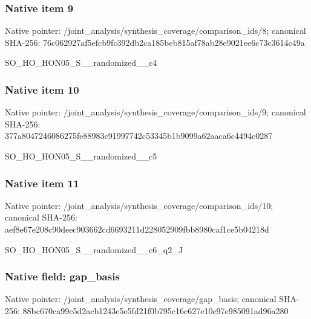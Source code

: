 \documentclass[10pt,a4paper]{article}
\begin{document}
\subsubsection{Native item 9}
Native pointer: /joint\_\allowbreak{}analysis/synthesis\_\allowbreak{}coverage/comparison\_\allowbreak{}ids/8; canonical SHA-256: 76c062927af5efcb9fc392db2ca185beb815af78ab28e9021ee6c73c3614c49a

\begingroup\raggedright\sloppy SO\_\allowbreak{}HO\_\allowbreak{}HON05\_\allowbreak{}S\_\allowbreak{}\_\allowbreak{}randomized\_\allowbreak{}\_\allowbreak{}c4\par\endgroup

\subsubsection{Native item 10}
Native pointer: /joint\_\allowbreak{}analysis/synthesis\_\allowbreak{}coverage/comparison\_\allowbreak{}ids/9; canonical SHA-256: 377a8047246086275fe88983c91997742c53345b1b9099a62aaca6c4494c0287

\begingroup\raggedright\sloppy SO\_\allowbreak{}HO\_\allowbreak{}HON05\_\allowbreak{}S\_\allowbreak{}\_\allowbreak{}randomized\_\allowbreak{}\_\allowbreak{}c5\par\endgroup

\subsubsection{Native item 11}
Native pointer: /joint\_\allowbreak{}analysis/synthesis\_\allowbreak{}coverage/comparison\_\allowbreak{}ids/10; canonical SHA-256: aef8e67e208c90deec903662cd6693211d228052909fbb8980caf1ce5b04218d

\begingroup\raggedright\sloppy SO\_\allowbreak{}HO\_\allowbreak{}HON05\_\allowbreak{}S\_\allowbreak{}\_\allowbreak{}randomized\_\allowbreak{}\_\allowbreak{}c6\_\allowbreak{}q2\_\allowbreak{}J\par\endgroup

\subsubsection{Native field: gap\_\allowbreak{}basis}
Native pointer: /joint\_\allowbreak{}analysis/synthesis\_\allowbreak{}coverage/gap\_\allowbreak{}basis; canonical SHA-256: 88bc670ca99c5d2acb1243e5e5fd21f0b795c16c627e10e97e985091ad96a280
\end{document}
